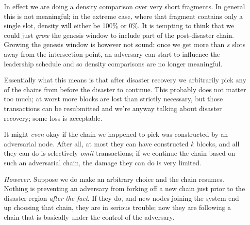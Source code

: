 \begin{center}
\end{center}
%
In effect we are doing a density comparison over very short fragments. In
general this is not meaningful; in the extreme case, where that fragment
contains only a single slot, density will either be 100\% or 0\%.
It is tempting to think that we could just \emph{grow} the genesis window to
include part of the post-disaster chain. Growing the genesis window is however
not sound: once we get more than $s$ slots away from the intersection point, an
adversary can start to influence the leadership schedule and so density
comparisons are no longer meaningful.

Essentially what this means is that after disaster recovery we arbitrarily pick
any of the chains from before the disaster to continue. This probably does not
matter too much; at worst more blocks are lost than strictly necessary, but
those transactions can be resubmitted and we're anyway talking about disaster
recovery; some loss is acceptable.

It might \emph{even} okay if the chain we happened to pick was constructed by an
adversarial node. After all, at most they can have constructed $k$ blocks, and
all they can do is selectively \emph{omit} transactions; if we continue the
chain based on such an adversarial chain, the damage they can do is very
limited.

\emph{However.} Suppose we do make an arbitrary choice and the chain resumes.
Nothing is preventing an adversary from forking off a new chain just prior to
the disaster region \emph{after the fact}. If they do, and new nodes joining
the system end up choosing that chain, they are in serious trouble; now they
are following a chain that is basically under the control of the adversary.

